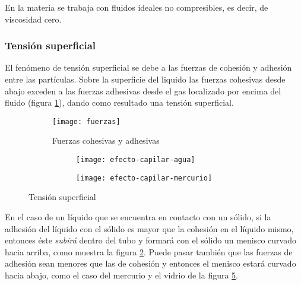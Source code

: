 En la materia \materia se trabaja con fluidos ideales no compresibles, es decir, de viscosidad cero.\\

\subsubsection{Tensión superficial}

El fenómeno de tensión superficial se debe a las fuerzas de cohesión y adhesión entre las partículas. Sobre la superficie del liquido las fuerzas cohesivas desde abajo exceden a las fuerzas adhesivas desde el gas localizado por encima del fluido (figura \ref{fuerzas_cohesivas_adhesivas}), dando como resultado una tensión superficial.

\begin{figure}[h]
	\centering
	\begin{subfigure}[b]{.45\linewidth}
		\centering
		\texttt{[image: fuerzas]}
		\caption{Fuerzas cohesivas y adhesivas}
		\label{fuerzas_cohesivas_adhesivas}
	\end{subfigure}
	\begin{subfigure}[b]{.45\linewidth}
		\centering
		\begin{subfigure}[b]{.45\linewidth}
			\texttt{[image: efecto-capilar-agua]}
			\caption{}
			\label{fig:capilaridad-agua}
		\end{subfigure}
		\begin{subfigure}[b]{.45\linewidth}
			\texttt{[image: efecto-capilar-mercurio]}
			\caption{}
			\label{fig:capilaridad-mercurio}
		\end{subfigure}
	\end{subfigure}
	\caption{Tensión superficial}
\end{figure}

En el caso de un líquido que se encuentra en contacto con un sólido, si la adhesión del líquido con el sólido es mayor que la cohesión en el líquido mismo, entonces éste \emph{subirá} dentro del tubo y formará con el sólido un menisco curvado hacia arriba, como muestra la figura \ref{fig:capilaridad-agua}. Puede pasar también que las fuerzas de adhesión sean menores que las de cohesión y entonces el menisco estará curvado hacia abajo, como el caso del mercurio y el vidrio de la figura \ref{fig:capilaridad-mercurio}.\\ %

